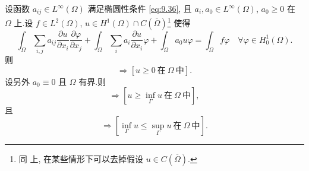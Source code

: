 \begin{proposition}
\label{prop:9.29}
设函数 $a_{ij}\in L^\infty(\Omega)$ 满足椭圆性条件 \eqref{eq:9.36}, 且
$a_i,a_0\in L^\infty(\Omega)$, $a_0\ge0$ 在 $\Omega$ 上.设
$f\in L^2(\Omega)$, $u\in H^1(\Omega)\cap C(\overline\Omega)$\footnote{同
上, 在某些情形下可以去掉假设 $u\in C(\overline\Omega)$.} 使得
\begin{equation}
\int_\Omega\sum_{i,j}a_{ij}\frac{\partial u}{\partial x_i}
\frac{\partial\varphi}{\partial x_j}
+\int_\Omega\sum_ia_i\frac{\partial u}{\partial x_i}\varphi
+\int_\Omega a_0u\varphi=\int_\Omega f\varphi
\quad\forall\varphi\in H_0^1(\Omega).
\label{eq:9.78}
\end{equation}
则
\begin{equation}
[u\ge0\ \text{在}\ \Gamma\ \text{上且}\ f\ge0\ \text{在}\ \Omega\ \text{中}]
\Rightarrow[u\ge0\ \text{在}\ \Omega\ \text{中}].
\label{eq:9.79}
\end{equation}
设另外 $a_0\equiv0$ 且 $\Omega$ 有界.则
\begin{equation}
[f\ge0\ \text{在}\ \Omega\ \text{中}]
\Rightarrow\left[u\ge\inf_\Gamma u\ \text{在}\ \Omega\ \text{中}\right],
\label{eq:9.80}
\end{equation}
且
\begin{equation}
[f=0\ \text{在}\ \Omega\ \text{中}]
\Rightarrow\left[\inf_\Gamma u\le\sup_\Gamma u\ \text{在}\ \Omega\
\text{中}\right].
\label{eq:9.81}
\end{equation}
\end{proposition}

